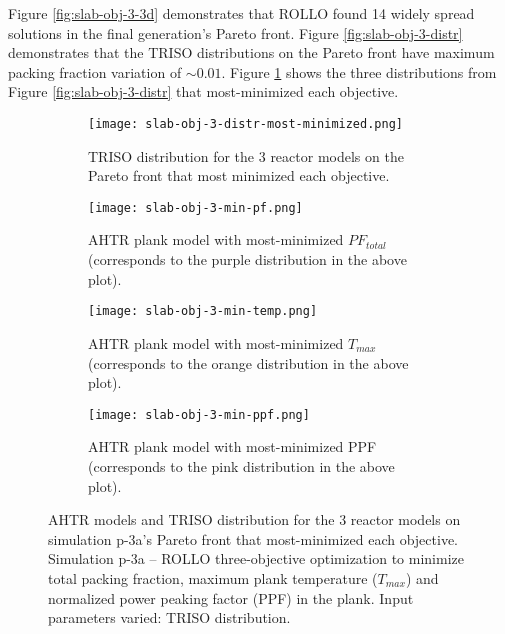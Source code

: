 Figure \ref{fig:slab-obj-3-3d} demonstrates that \gls{ROLLO} found 14 widely spread 
solutions in the final generation's Pareto front. 
Figure \ref{fig:slab-obj-3-distr} demonstrates that the TRISO distributions on the
Pareto front have maximum packing fraction variation of $\sim0.01$. 
Figure \ref{fig:slab-obj-3-distr-most-minimized} shows the three distributions from 
Figure \ref{fig:slab-obj-3-distr} that most-minimized each objective. 
\begin{figure}[htbp!]
    \centering
    \begin{subfigure}{\textwidth}
        \texttt{[image: slab-obj-3-distr-most-minimized.png]}
        \caption{TRISO distribution for the 3 reactor models on the Pareto front
        that most minimized each objective.}
        \label{fig:slab-obj-3-distr-most-minimized}
    \end{subfigure}
    \begin{subfigure}{0.8\textwidth}
        \texttt{[image: slab-obj-3-min-pf.png]}
        \caption{\gls{AHTR} plank model with most-minimized $PF_{total}$ 
        (corresponds to the purple distribution in the above plot).}
        \label{fig:slab-obj-3-min-pf} 
    \end{subfigure}
    \begin{subfigure}{0.8\textwidth}
        \texttt{[image: slab-obj-3-min-temp.png]}
        \caption{\gls{AHTR} plank model with most-minimized $T_{max}$
        (corresponds to the orange distribution in the above plot).}
        \label{fig:slab-obj-3-min-temp} 
    \end{subfigure}
    \begin{subfigure}{0.8\textwidth}
        \texttt{[image: slab-obj-3-min-ppf.png]}
        \caption{\gls{AHTR} plank model with most-minimized PPF
        (corresponds to the pink distribution in the above plot).}
        \label{fig:slab-obj-3-min-ppf} 
    \end{subfigure}
    \caption{AHTR models and TRISO distribution for the 3 reactor models on simulation 
    p-3a's Pareto front that most-minimized each objective.
    Simulation p-3a -- ROLLO three-objective optimization to minimize total packing fraction, 
    maximum plank temperature ($T_{max}$) and normalized power peaking factor (PPF) in the plank. 
    Input parameters varied: TRISO distribution.}
    \label{fig:slab-obj-3-most-minimized}
\end{figure}


